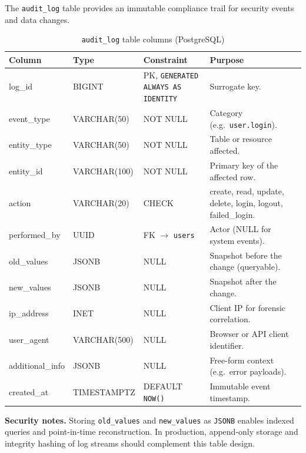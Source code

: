 The \texttt{audit\_log} table provides an immutable compliance trail for security events and data changes.

\begin{table}[htbp]
  \centering
  \caption{\texttt{audit\_log} table columns (PostgreSQL)}
  \label{tab:audit}
  \small
  \setlength{\tabcolsep}{4pt}
  \renewcommand{\arraystretch}{1.15}
  \begin{tabularx}{\textwidth}{@{} l l l X @{}}
    \toprule
    \textbf{Column} & \textbf{Type} & \textbf{Constraint} & \textbf{Purpose} \\
    \midrule
    log\_id          & BIGINT          & PK, \texttt{GENERATED ALWAYS AS IDENTITY} & Surrogate key. \\
    event\_type      & VARCHAR(50)     & NOT NULL        & Category (e.g.\ \texttt{user.login}). \\
    entity\_type     & VARCHAR(50)     & NOT NULL        & Table or resource affected. \\
    entity\_id       & VARCHAR(100)    & NOT NULL        & Primary key of the affected row. \\
    action           & VARCHAR(20)     & CHECK           & create, read, update, delete, login, logout, failed\_login. \\
    performed\_by    & UUID            & FK $\to$ \texttt{users}  & Actor (NULL for system events). \\
    old\_values      & JSONB           & NULL            & Snapshot before the change (queryable). \\
    new\_values      & JSONB           & NULL            & Snapshot after the change. \\
    ip\_address      & INET            & NULL            & Client IP for forensic correlation. \\
    user\_agent      & VARCHAR(500)    & NULL            & Browser or API client identifier. \\
    additional\_info & JSONB           & NULL            & Free-form context (e.g.\ error payloads). \\
    created\_at      & TIMESTAMPTZ     & DEFAULT \texttt{NOW()} & Immutable event timestamp. \\
    \bottomrule
  \end{tabularx}
\end{table}

\noindent\textbf{Security notes.}
Storing \texttt{old\_values} and \texttt{new\_values} as \texttt{JSONB} enables indexed queries and point-in-time reconstruction. In production, append-only storage and integrity hashing of log streams should complement this table design.

